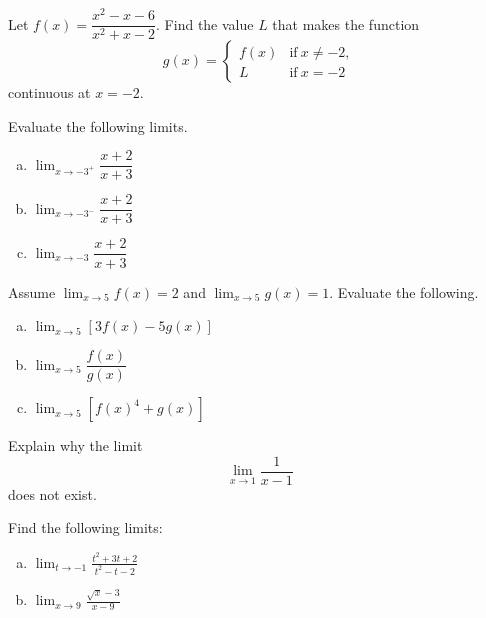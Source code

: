\documentclass[10pt]{amsart}
\begin{document}
\begin{thm}
  Let \(f(x) = \dfrac{x^2 - x - 6}{x^2 + x - 2}\).
  Find the value \(L\) that makes the function
  \[g(x) = \left\{\begin{array}{ll}
  f(x) & \text{if}\ x \neq -2,\\
  L & \text{if}\ x = -2
  \end{array}
  \right.\]
  continuous at \(x = -2\).
\end{thm}

\newpage

\begin{thm}
  Evaluate the following limits.
  \begin{multicols}{3}
  \begin{enumerate}[(a)]
  \item
    \(\lim_{x\to -3^+}\dfrac{x+2}{x+3}\)
  \item
    \(\lim_{x\to -3^-}\dfrac{x+2}{x+3}\)
  \item
    \(\lim_{x\to -3}\dfrac{x+2}{x+3}\)
  \end{enumerate}
\end{multicols}
\end{thm}

\vspace{2in}

\begin{thm}
  Assume \(\lim_{x\to 5}f(x)=2\) and \(\lim_{x\to 5}g(x)=1\).
  Evaluate the following.
  \begin{multicols}{3}
  \begin{enumerate}[(a)]
  \item
    \(\lim_{x\to 5} [3f(x)-5g(x)]\)
  \item
    \(\lim_{x\to 5} \dfrac{f(x)}{g(x)}\)
  \item
    \(\lim_{x\to 5} [f(x)^4+g(x)]\)
  \end{enumerate}
  \end{multicols}
\end{thm}

\vspace{1in}

\begin{thm}
  Explain why the limit $$\lim_{x\rightarrow 1}\frac{1}{x-1}$$ does not exist.
\end{thm}

\newpage

\begin{thm}
  Find the following limits:
  \begin{multicols}{2}
  \begin{enumerate}[(a)]
  \item
    \(\lim_{t\rightarrow -1}\frac{t^2+3t+2}{t^2-t-2}\)
  \item
    \(\lim_{x\rightarrow 9}\frac{\sqrt{x}-3}{x-9}\)
  \end{enumerate}
  \end{multicols}
\end{thm}
\end{document}
